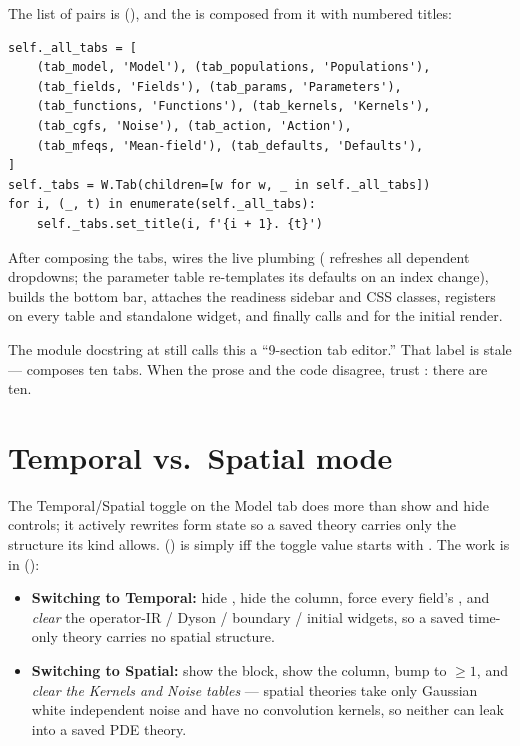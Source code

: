 The list of  pairs is 
(), and the  is composed from it with
numbered titles:

\begin{lstlisting}
self._all_tabs = [
    (tab_model, 'Model'), (tab_populations, 'Populations'),
    (tab_fields, 'Fields'), (tab_params, 'Parameters'),
    (tab_functions, 'Functions'), (tab_kernels, 'Kernels'),
    (tab_cgfs, 'Noise'), (tab_action, 'Action'),
    (tab_mfeqs, 'Mean-field'), (tab_defaults, 'Defaults'),
]
self._tabs = W.Tab(children=[w for w, _ in self._all_tabs])
for i, (_, t) in enumerate(self._all_tabs):
    self._tabs.set_title(i, f'{i + 1}. {t}')
\end{lstlisting}

After composing the tabs,  wires the live plumbing
( refreshes all dependent dropdowns; the parameter
table re-templates its defaults on an index change), builds the bottom bar,
attaches the readiness sidebar and CSS classes, registers  on
every table and standalone widget, and finally calls 
and  for the initial render.

\begin{note}
The module docstring at  still calls this a
``9-section tab editor.'' That label is stale ---  composes ten
tabs. When the prose and the code disagree, trust : there are
ten.
\end{note}

\section{Temporal vs.\ Spatial mode}

The Temporal/Spatial toggle on the Model tab does more than show and hide
controls; it actively rewrites form state so a saved theory carries only the
structure its kind allows. 
() is simply  iff the toggle value starts
with . The work is in 
():

\begin{itemize}
  \item \textbf{Switching to Temporal:} hide , hide the
         column, force every field's , and
        \emph{clear} the operator-IR / Dyson / boundary / initial widgets, so a
        saved time-only theory carries no spatial structure.
  \item \textbf{Switching to Spatial:} show the block, show the column, bump
         to $\ge 1$, and \emph{clear the Kernels and Noise
        tables} --- spatial theories take only Gaussian white independent noise and
        have no convolution kernels, so neither can leak into a saved PDE theory.
\end{itemize}

